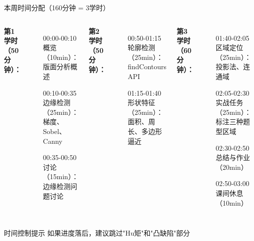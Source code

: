 
\begin{frame}{本周时间分配（160分钟 = 3学时）}
    \begin{columns}
        \textbf{第1学时（50分钟）：}
        \begin{itemize}
            \item[00:00-00:10] 概览（10min）：版面分析概述
            \item[00:10-00:35] 边缘检测（25min）：梯度、Sobel、Canny
            \item[00:35-00:50] 讨论（15min）：边缘检测问题讨论
        \end{itemize}

        \textbf{第2学时（50分钟）：}
        \begin{itemize}
            \item[00:50-01:15] 轮廓检测（25min）：findContours API
            \item[01:15-01:40] 形状特征（25min）：面积、周长、多边形逼近
        \end{itemize}

        \textbf{第3学时（60分钟）：}
        \begin{itemize}
            \item[01:40-02:05] 区域定位（25min）：投影法、连通域
            \item[02:05-02:30] 实战任务（25min）：标注三种题型区域
            \item[02:30-02:50] 总结与作业（20min）
            \item[02:50-03:00] 课间休息（10min）
        \end{itemize}
    \end{columns}

    \vspace{0.5cm}

    \begin{alertblock}{时间控制提示}
    如果进度落后，建议跳过"Hu矩"和"凸缺陷"部分
    \end{alertblock}
\end{frame}

